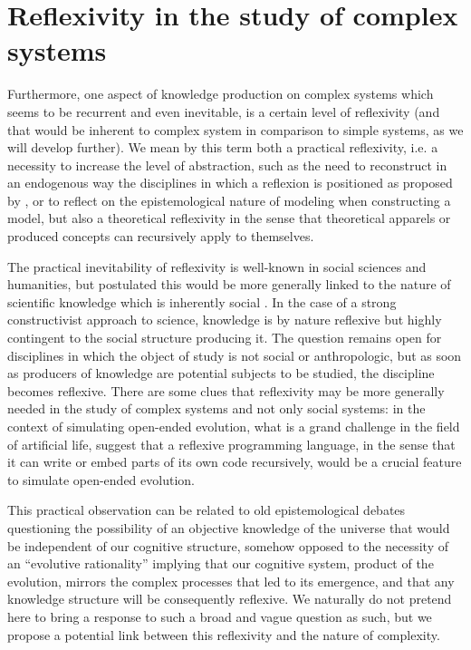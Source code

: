 \documentclass[graybox]{svmult}
\begin{document}
\section{Reflexivity in the study of complex systems}




Furthermore, one aspect of knowledge production on complex systems which seems to be recurrent and even inevitable, is a certain level of reflexivity (and that would be inherent to complex system in comparison to simple systems, as we will develop further). We mean by this term both a practical reflexivity, i.e. a necessity to increase the level of abstraction, such as the need to reconstruct in an endogenous way the disciplines in which a reflexion is positioned as proposed by \cite{2017arXiv171200805R}, or to reflect on the epistemological nature of modeling when constructing a model, but also a theoretical reflexivity in the sense that theoretical apparels or produced concepts can recursively apply to themselves.

The practical inevitability of reflexivity is well-known in social sciences and humanities, but \cite{bourdieu2004science} postulated this would be more generally linked to the nature of scientific knowledge which is inherently social \cite{maton2003reflexivity}. In the case of a strong constructivist approach to science, knowledge is by nature reflexive but highly contingent to the social structure producing it. The question remains open for disciplines in which the object of study is not social or anthropologic, but as soon as producers of knowledge are potential subjects to be studied, the discipline becomes reflexive. There are some clues that reflexivity may be more generally needed in the study of complex systems and not only social systems: in the context of simulating open-ended evolution, what is a grand challenge in the field of artificial life, \cite{banzhaf2016defining} suggest that a reflexive programming language, in the sense that it can write or embed parts of its own code recursively, would be a crucial feature to simulate open-ended evolution.


This practical observation can be related to old epistemological debates questioning the possibility of an objective knowledge of the universe that would be independent of our cognitive structure, somehow opposed to the necessity of an ``evolutive rationality'' implying that our cognitive system, product of the evolution, mirrors the complex processes that led to its emergence, and that any knowledge structure will be consequently reflexive. We naturally do not pretend here to bring a response to such a broad and vague question as such, but we propose a potential link between this reflexivity and the nature of complexity. 
\end{document}
